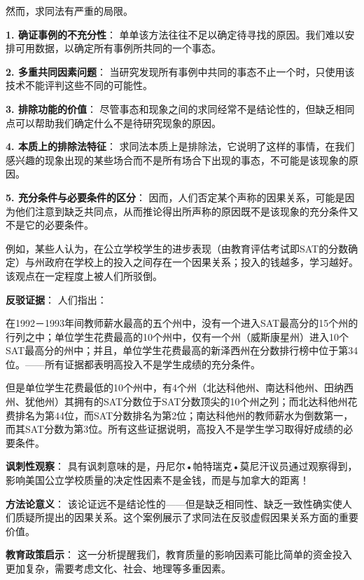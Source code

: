 \begin{theorembox}[title=求同法的严重局限性]
然而，求同法有严重的局限。

\textbf{1. 确证事例的不充分性}：
单单该方法往往不足以确定待寻找的原因。我们难以安排可用数据，以确定所有事例所共同的一个事态。

\textbf{2. 多重共同因素问题}：
当研究发现所有事例中共同的事态不止一个时，只使用该技术不能评判这些不同的可能性。

\textbf{3. 排除功能的价值}：
尽管事态和现象之间的求同经常不是结论性的，但缺乏相同点可以帮助我们确定什么不是待研究现象的原因。

\textbf{4. 本质上的排除法特征}：
求同法本质上是排除法，它说明了这样的事情，在我们感兴趣的现象出现的某些场合而不是所有场合下出现的事态，不可能是该现象的原因。

\textbf{5. 充分条件与必要条件的区分}：
因而，人们否定某个声称的因果关系，可能是因为他们注意到缺乏共同点，从而推论得出所声称的原因既不是该现象的充分条件又不是它的必要条件。
\end{theorembox}

\begin{examplebox}[title=求同法的反驳应用：教育投入与学业成绩关系的质疑]
例如，某些人认为，在公立学校学生的进步表现（由教育评估考试即SAT的分数确定）与州政府在学校上的投入之间存在一个因果关系；投入的钱越多，学习越好。该观点在一定程度上被人们所驳倒。

\textbf{反驳证据}：
人们指出：

在1992－1993年间教师薪水最高的五个州中，没有一个进入SAT最高分的15个州的行列之中；单位学生花费最高的10个州中，仅有一个州（威斯康星州）进入10个SAT最高分的州中；并且，单位学生花费最高的新泽西州在分数排行榜中位于第34位。——所有证据都表明高投入不是学生成绩的充分条件。

但是单位学生花费最低的10个州中，有4个州（北达科他州、南达科他州、田纳西州、犹他州）其拥有的SAT分数位于SAT分数顶尖的10个州之列；而北达科他州花费排名为第44位，而SAT分数排名为第2位；南达科他州的教师薪水为倒数第一，而其SAT分数为第3位。所有这些证据说明，高投入不是学生学习取得好成绩的必要条件。\cite{forbes1996}

\textbf{讽刺性观察}：
具有讽刺意味的是，丹尼尔•帕特瑞克•莫尼汗议员通过观察得到，影响美国公立学校质量的决定性因素不是金钱，而是与加拿大的距离！

\textbf{方法论意义}：
该论证远不是结论性的——但是缺乏相同性、缺乏一致性确实使人们质疑所提出的因果关系。这个案例展示了求同法在反驳虚假因果关系方面的重要价值。

\textbf{教育政策启示}：
这一分析提醒我们，教育质量的影响因素可能比简单的资金投入更加复杂，需要考虑文化、社会、地理等多重因素。
\end{examplebox}

